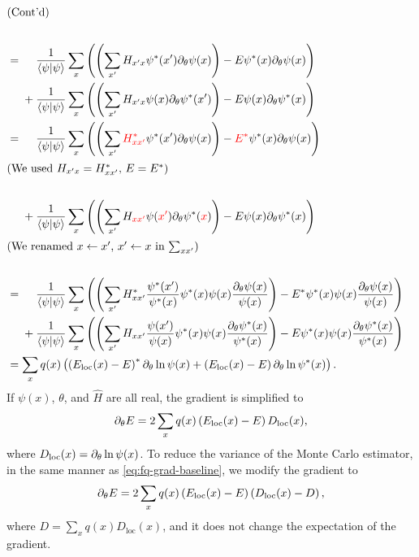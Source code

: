 \begin{align}
\intertext{(Cont'd)} \nonumber \\
&= \phantom{{}+{}}\frac{1}{\ip{\psi}} \sum_x \left( \left( \sum_{x'} H_{x' x} \psi^*(x') \pp_\theta \psi(x) \right) - E \psi^*(x) \pp_\theta \psi(x) \right) \nonumber \\
&\phantom{{}={}}+ \frac{1}{\ip{\psi}} \sum_x \left( \left( \sum_{x'} H_{x' x} \psi(x) \pp_\theta \psi^*(x') \right) - E \psi(x) \pp_\theta \psi^*(x) \right) \\
&= \phantom{{}+{}}\frac{1}{\ip{\psi}} \sum_x \left( \left( \sum_{x'} {\color{red} H^*_{x x'}} \psi^*(x') \pp_\theta \psi(x) \right) - {\color{red} E^*} \psi^*(x) \pp_\theta \psi(x) \right) \nonumber \\
\intertext{(We used $H_{x' x} = H^*_{x x'}$, $E = E^*$)} \nonumber \\
&\phantom{{}={}}+ \frac{1}{\ip{\psi}} \sum_x \left( \left( \sum_{x'} H_{\color{red} x x'} \psi({\color{red} x'}) \pp_\theta \psi^*({\color{red} x}) \right) - E \psi(x) \pp_\theta \psi^*(x) \right) \\
\intertext{(We renamed $x \gets x'$, $x' \gets x$ in $\sum_{x x'}$)} \nonumber \\
%
&= \phantom{{}+{}}\frac{1}{\ip{\psi}} \sum_x \left( \left( \sum_{x'} H_{x x'}^* \frac{\psi^*(x')}{\psi^*(x)} \psi^*(x) \psi(x) \frac{\pp_\theta \psi(x)}{\psi(x)} \right) - E^* \psi^*(x) \psi(x) \frac{\pp_\theta \psi(x)}{\psi(x)} \right) \nonumber \\
&\phantom{{}={}}+ \frac{1}{\ip{\psi}} \sum_x \left( \left( \sum_{x'} H_{x x'} \frac{\psi(x')}{\psi(x)} \psi^*(x) \psi(x) \frac{\pp_\theta \psi^*(x)}{\psi^*(x)} \right) - E \psi^*(x) \psi(x) \frac{\pp_\theta \psi^*(x)}{\psi^*(x)} \right) \\
&= \sum_x q(x) \left( \left( E_\text{loc}(x) - E \right)^* \pp_\theta \ln \psi(x) + \left( E_\text{loc}(x) - E \right) \pp_\theta \ln \psi^*(x) \right).
\end{align}
If $\psi(x)$, $\theta$, and $\hat{H}$ are all real, the gradient is simplified to
\begin{equation}
\partial_\theta E = 2 \sum_x q(x) \left( E_\text{loc}(x) - E \right) D_\text{loc}(x),
\end{equation}
where $D_\text{loc}(x) = \partial_\theta \ln \psi(x)$. To reduce the variance of the Monte Carlo estimator, in the same manner as \cref{eq:fq-grad-baseline}, we modify the gradient to
\begin{equation}
\partial_\theta E = 2 \sum_x q(x) \left( E_\text{loc}(x) - E \right) \left( D_\text{loc}(x) - D \right),
\end{equation}
where $D = \sum_x q(x) D_\text{loc}(x)$, and it does not change the expectation of the gradient.
